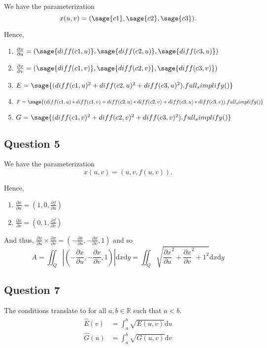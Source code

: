 \documentclass[12pt]{article}
\begin{document}
We have the parameterization 
$$x(u,v) = (\sage{c1}, \sage{c2}, \sage{c3}).$$

Hence,

\begin{enumerate}
\item $\frac{ \partial x}{\partial u} = (\sage{diff(c1,u)}, \sage{diff(c2, u)}, \sage{diff(c3,u)})$ 
\item $\frac{ \partial x}{\partial v} = (\sage{diff(c1,v)}, \sage{diff(c2, v)}, \sage{diff(c3,v)})$
\item $E = \sage{(diff(c1,u)^2 + diff(c2,u)^2 + diff(c3,u)^2).full_simplify()}$
\item $F = \sage{(diff(c1,u)*diff(c1,v) + diff(c2,u)*diff(c2,v) + diff(c3,u)*diff(c3,v)).full_simplify()}$ 
\item $G = \sage{(diff(c1,v)^2 + diff(c2,v)^2 + diff(c3,v)^2).full_simplify()}$
\end{enumerate}

\subsection*{Question 5}

We have the parameterization 
$$x(u,v) = (u,v, f(u,v)).$$

Hence,

\begin{enumerate}
\item $\frac{ \partial x}{\partial u} = (1, 0, \frac{ \partial f}{\partial u})$ 
\item $\frac{ \partial x}{\partial v} = (0,1, \frac{ \partial f}{\partial v})$
\end{enumerate}

And thus, $\frac{ \partial x}{\partial u} \times \frac{ \partial x}{\partial v} = (-\frac{ \partial x}{\partial u} ,-\frac{ \partial x}{\partial v}, 1)$
and so 
$$ A = \iint_Q |(-\frac{ \partial x}{\partial u} ,-\frac{ \partial x}{\partial v}, 1)| \mathrm dx \mathrm dy = \iint_Q \sqrt{\frac{ \partial x}{\partial u}^2 +\frac{ \partial x}{\partial v}^2 + 1^2} \mathrm dx \mathrm dy$$

\subsection*{Question 7}

The conditions translate to for all $a, b\in \mathbb R$ such that $a < b$.
\begin{align}
    \begin{split}
        \hat{E}(v) &= \int_a^b \sqrt{E(u,v)} \mathrm{d}u\\
        \hat{G}(u) &= \int_a^b \sqrt{G(u,v)} \mathrm{d}v
    \end{split}
\end{align}
\end{document}
